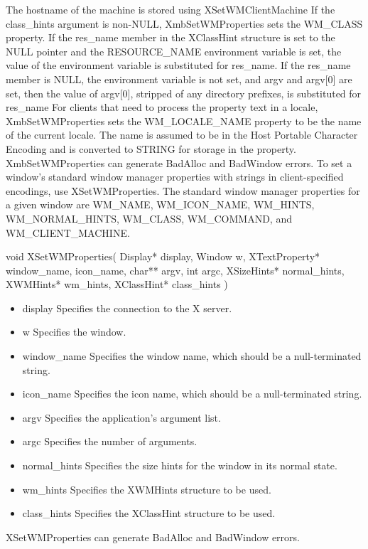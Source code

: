 \documentclass{report}
\begin{document}
\begin{itemize}
\begin{itemize}
            The hostname of the machine is stored using XSetWMClientMachine
            \bigbreak \noindent 
            If the class\_hints argument is non-NULL, XmbSetWMProperties sets the WM\_CLASS property. If the res\_name member in the XClassHint structure is set to the NULL pointer and the RESOURCE\_NAME environment variable is set, the value of the environment variable is substituted for res\_name. If the res\_name member is NULL, the environment variable is not set, and argv and argv[0] are set, then the value of argv[0], stripped of any directory prefixes, is substituted for res\_name
            \bigbreak \noindent 
            For clients that need to process the property text in a locale, XmbSetWMProperties sets the WM\_LOCALE\_NAME property to be the name of the current locale. The name is assumed to be in the Host Portable Character Encoding and is converted to STRING for storage in the property.
            \bigbreak \noindent 
            XmbSetWMProperties can generate BadAlloc and BadWindow errors.
            \bigbreak \noindent 
            To set a window’s standard window manager properties with strings in client-specified encodings, use XSetWMProperties. The standard window manager properties for a given window are WM\_NAME, WM\_ICON\_NAME, WM\_HINTS, WM\_NORMAL\_HINTS, WM\_CLASS, WM\_COMMAND, and WM\_CLIENT\_MACHINE.
            \bigbreak \noindent 
            \begin{cppcode}
            void XSetWMProperties(
                Display* display,
                Window w,
                XTextProperty* window_name, icon_name,
                char** argv,
                int argc,
                XSizeHints* normal_hints,
                XWMHints* wm_hints,
                XClassHint* class_hints
            )
            \end{cppcode}
            \bigbreak \noindent
            \begin{itemize}
                \item display Specifies the connection to the X server.
                \item w Specifies the window.
                \item window\_name Specifies the window name, which should be a null-terminated string.
                \item icon\_name Specifies the icon name, which should be a null-terminated string.
                \item argv Specifies the application’s argument list.
                \item argc Specifies the number of arguments.
                \item normal\_hints Specifies the size hints for the window in its normal state.
                \item wm\_hints Specifies the XWMHints structure to be used.
                \item class\_hints Specifies the XClassHint structure to be used.
            \end{itemize}
            XSetWMProperties can generate BadAlloc and BadWindow errors.




\end{itemize}
\end{itemize}
\end{document}
